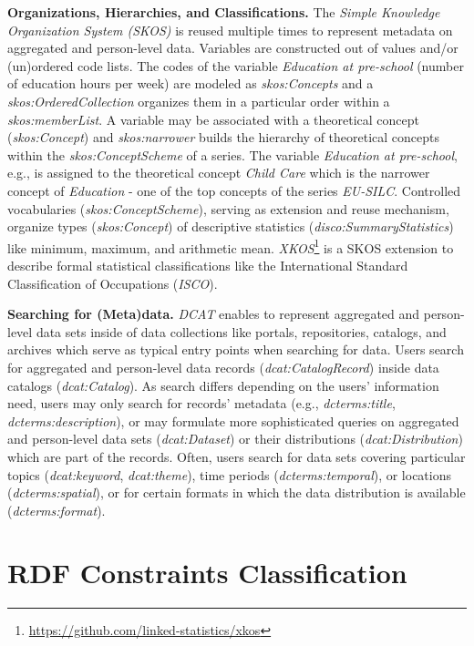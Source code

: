 \documentclass{llncs}
\begin{document}
\textbf{Organizations, Hierarchies, and Classifications.}
The \emph{Simple Knowledge Organization System (SKOS)} is reused multiple times to represent metadata on aggregated and person-level data.
Variables are constructed out of values and/or (un)ordered code lists.
The codes of the variable \emph{Education at pre-school} (number of education hours per week) are modeled as \emph{skos:Concepts} and 
a \emph{skos:OrderedCollection} organizes them in a particular order within a \emph{skos:memberList}.
A variable may be associated with a theoretical concept (\emph{skos:Concept}) and   
\emph{skos:narrower} builds the hierarchy of theoretical concepts within the \emph{skos:ConceptScheme} of a series.
The variable \emph{Education at pre-school}, e.g., is assigned to the theoretical concept \emph{Child Care} which is the narrower concept of \emph{Education} - one of the top concepts of the series \emph{EU-SILC}.
Controlled vocabularies (\emph{skos:ConceptScheme}), serving as extension and reuse mechanism,
organize types (\emph{skos:Concept}) of descriptive statistics (\emph{\emph{disco:SummaryStatistics}}) like minimum, maximum, and arithmetic mean.
\emph{XKOS}\footnote{\url{https://github.com/linked-statistics/xkos}} is a SKOS extension to describe formal statistical classifications like the International Standard Classification of Occupations (\emph{ISCO}). 

\textbf{Searching for (Meta)data.}
\emph{DCAT} enables to represent aggregated and person-level data sets inside of data collections like portals, repositories, catalogs, and archives
which serve as typical entry points when searching for data.
Users search for aggregated and person-level data records (\emph{dcat:CatalogRecord}) inside data catalogs (\emph{dcat:Catalog}). 
As search differs depending on the users’ information need,
users may only search for records' metadata (e.g., \emph{dcterms:title}, \emph{dcterms:description}), 
or may formulate more sophisticated queries on aggregated and person-level data sets (\emph{dcat:Dataset}) or their
distributions (\emph{dcat:Distribution}) which are part of the records. 
Often, users search for data sets covering particular topics (\emph{dcat:keyword}, \emph{dcat:theme}), time periods (\emph{dcterms:temporal}),  or  locations (\emph{dcterms:spatial}), 
or for certain formats in which the data distribution is available (\emph{dcterms:format}). 

\section{RDF Constraints Classification}
\label{classification}
\end{document}
